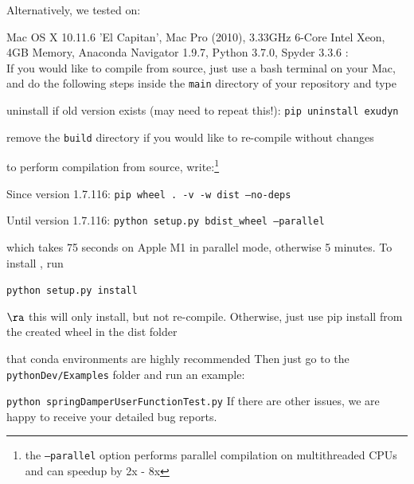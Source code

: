 Alternatively, we tested on:
\bi
  \item Mac OS X 10.11.6 'El Capitan', Mac Pro (2010), 3.33GHz 6-Core Intel Xeon, 4GB Memory, Anaconda Navigator 1.9.7, Python 3.7.0, Spyder 3.3.6
\ei
%
\vspace{9pt}
:\vspace{3pt}\\
If you would like to compile from source, just use a bash terminal on your Mac, and do the following steps inside the \texttt{main} directory of your repository and type
\bi
  \item uninstall if old version exists (may need to repeat this!): \texttt{pip uninstall exudyn}
  \item remove the \texttt{build} directory if you would like to re-compile without changes
  \item to perform compilation from source, write:\footnote{the \texttt{--parallel} option performs parallel compilation on multithreaded CPUs and can speedup by 2x - 8x}
  \item Since version 1.7.116: \texttt{pip wheel . -v -w dist --no-deps}
  \item Until version 1.7.116: \texttt{python setup.py bdist\_wheel --parallel}
  \item which takes 75 seconds on Apple M1 in parallel mode, otherwise 5 minutes. To install \codeName, run
  \item[] \texttt{python setup.py install}
  \item[] $\ra$ this will only install, but not re-compile. Otherwise, just use pip install from the created wheel in the dist folder
  \item[]  that conda environments are highly recommended
\ei
Then just go to the \texttt{pythonDev/Examples} folder and run an example:
\bi
  \item[] \texttt{python springDamperUserFunctionTest.py}
\ei
If there are other issues, we are happy to receive your detailed bug reports. 

